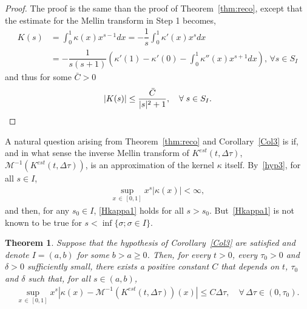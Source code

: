 \documentclass[10pt]{amsart}
\newtheorem{theo}{Theorem}[section]
\theoremstyle{definition}\newtheorem{defi}[theo]{Definition}\newtheorem{rema}[theo]{Remark}\newtheorem{exam}[theo]{Example}\newtheorem{exem}[theo]{Example}\newtheorem{nota}[theo]{Notation}
\newcommand*\dst{\displaystyle}
\newcommand*\M{\mathcal{M}}
\let\oldforall\forall
\renewcommand*{\forall}{\mathrel{\oldforall}}
\begin{document}
\begin{proof}
The proof is the same than the proof of Theorem~\ref{thm:reco}, except that the estimate for the Mellin transform in Step 1 becomes,
\begin{align*}
K(s)& = \dst\int_0^1 \kappa(x)x^{s-1} dx = -\dfrac{1}{s}\dst\int_0^1 \kappa'(x)x^{s} dx\\
& = -\dfrac{1}{s(s+1)}\left(\kappa'(1) -\kappa'(0) - \dst\int_0^1 \kappa''(x) x^{s+1} dx\right),\,\forall s\in S_I
\end{align*}
and thus for some $\bar{C}>0$
\begin{equation*}
|K(s)| \leq \dfrac{\bar{C}}{|s|^2+1},\quad\forall s\in S_I.\qedhere
\end{equation*}
\end{proof}
A natural question arising from Theorem~\ref{thm:reco} and Corollary~\ref{Col3} is if, and in what sense the inverse Mellin transform of $K^{est}(t, \Delta \tau)$, $\M^{-1}(K^{est}(t, \Delta \tau))$, is an approximation of the kernel $\kappa$ itself. By~\eqref{hyp3}, for all $s\in I$,
\begin{align}\label{Hkappa1}
\sup_{x\,\in\,[0, 1]}x^s|\kappa (x)|<\infty,
\end{align}
and then, for any $s_0\in I$, \eqref{Hkappa1} holds for all $s>s_0$. But~\eqref{Hkappa1} is not known to be true for $s<\inf\{\sigma; \sigma \in I\}$.

\begin{theo}\label{prop3}
Suppose that the hypothesis of Corollary~\ref{Col3} are satisfied and denote $I=(a, b)$ for some $b>a\ge 0$. Then, for every $t>0$, every $\tau_0 >0$ and $\delta >0$ sufficiently small, there exists a positive constant $C$ that depends on $t$, $\tau _0$ and $\delta $ such that, for all $s\in (a, b)$,
\begin{align}\label{prop3E0}
\sup_{x\,\in\,[0, 1]}x^s\left|\kappa (x)-\M^{-1}\left(K^{est}(t, \Delta \tau) \right)(x)\right|\le C\Delta \tau,\quad\forall\, \Delta \tau\in (0, \tau _0).
\end{align}
\end{theo}
\end{document}

